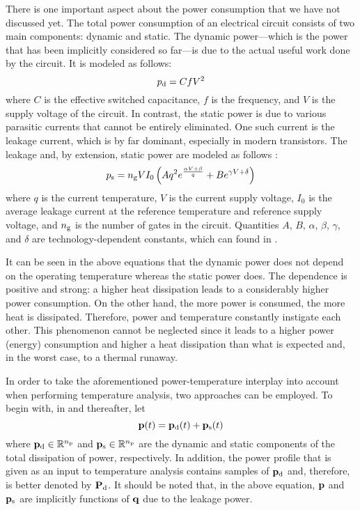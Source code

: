 There is one important aspect about the power consumption that we have not
discussed yet. The total power consumption of an electrical circuit consists of
two main components: dynamic and static. The dynamic power---which is the power
that has been implicitly considered so far---is due to the actual useful work
done by the circuit. It is modeled as follows:
\[
  p_{\mathrm{d}} = C f V^2
\]
where $C$ is the effective switched capacitance, $f$ is the frequency, and $V$
is the supply voltage of the circuit. In contrast, the static power is due to
various parasitic currents that cannot be entirely eliminated. One such current
is the leakage current, which is by far dominant, especially in modern 
transistors. The leakage and, by extension, static power are modeled as follows
\cite{liao2005}:
\begin{equation} \elab{static-power}
  p_\static = \numberof{g} V I_0 \left( A q^2 e^{\frac{\alpha V + \beta}{q}} + B e^{\gamma V + \delta} \right)
\end{equation}
where $q$ is the current temperature, $V$ is the current supply voltage, $I_0$
is the average leakage current at the reference temperature and reference supply
voltage, and ${n_\mathrm{g}}$ is the number of gates in the circuit. Quantities
$A$, $B$, $\alpha$, $\beta$, $\gamma$, and $\delta$ are technology-dependent
constants, which can found in \cite{liao2005}.

It can be seen in the above equations that the dynamic power does not depend on
the operating temperature whereas the static power does. The dependence is
positive and strong: a higher heat dissipation leads to a considerably higher
power consumption. On the other hand, the more power is consumed, the more heat
is dissipated. Therefore, power and temperature constantly instigate each other.
This phenomenon cannot be neglected since it leads to a higher power (energy)
consumption and higher a heat dissipation than what is expected and, in the
worst case, to a thermal runaway.

In order to take the aforementioned power-temperature interplay into account
when performing temperature analysis, two approaches can be employed. To begin
with, in  and thereafter, let
\[
  \mathbf{p}(t) = \mathbf{p}_{\mathrm{d}}(t) + \mathbf{p}_{\mathrm{s}}(t)
\]
where $\mathbf{p}_{\mathrm{d}} \in \mathbb{R}^{n_\mathrm{p}}$ and $\mathbf{p}_{\mathrm{s}} \in \mathbb{R}^{n_\mathrm{p}}$ are the
dynamic and static components of the total dissipation of power, respectively.
In addition, the power profile that is given as an input to temperature analysis
contains samples of $\mathbf{p}_{\mathrm{d}}$ and, therefore, is better denoted by
$\mathbf{P}_{\mathrm{d}}$. It should be noted that, in the above equation, $\mathbf{p}$ and
$\mathbf{p}_{\mathrm{s}}$ are implicitly functions of $\mathbf{q}$ due to the leakage power.


